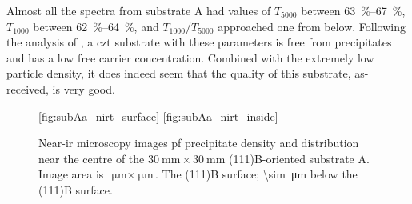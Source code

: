Almost all the spectra from substrate A had values of $T_{5000}$ between \SIrange{63}{67}{\percent}, $T_{1000}$ between \SIrange{62}{64}{\percent}, and $T_{1000}/T_{5000}$ approached one from below. Following the analysis of \citeauthor{yujie2004infrared}, a \ac{czt} substrate with these parameters is free from precipitates and has a low free carrier concentration. Combined with the extremely low particle density, it does indeed seem that the quality of this substrate, as-received, is very good. %

\begin{figure}[htbp]
    \centering
    [fig:subAa_nirt_surface]
    \hfill
    [fig:subAa_nirt_inside]
    \caption[Near-\ac{ir} microscopy images pf  precipitates in substrate A.]{Near-\ac{ir} microscopy images pf  precipitate density and distribution near the centre of the $\SI{30}{\milli\metre}\times\SI{30}{\milli\metre}$ (111)B-oriented substrate A. Image area is $\SI{}{\micro\metre}\times\SI{}{\micro\metre}$.  The (111)B surface;  \SI{\sim}{\micro\metre} below the (111)B surface.}\label{fig:subAa_nirt}
\end{figure}


\begin{comment}\todo{}
Mange artikler i denne katalogen: G:\Brukere\ESg\papers\CMT\CdZnTe

se spesielt på 
-	figurer i »CZT inclusions Belas 2008»
-	CZT substrates Japan Energy (de som lager våre subs)
-	Fig 1 i Defects in CZT. Hossain-2015

\end{comment}

